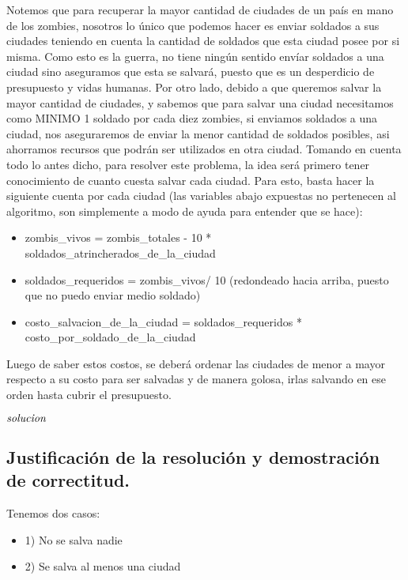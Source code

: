Notemos que para recuperar la mayor cantidad de ciudades de un país en mano de los zombies, nosotros lo único que podemos hacer es enviar soldados a sus ciudades teniendo en cuenta la cantidad de soldados que esta ciudad posee por si misma. Como esto es la guerra, no tiene ningún sentido envíar soldados a una ciudad sino aseguramos que esta se salvará, puesto que es un desperdicio de presupuesto y vidas humanas. Por otro lado, debido a que queremos salvar la mayor cantidad de ciudades, y sabemos que para salvar una ciudad necesitamos como MINIMO 1 soldado por cada diez zombies, si enviamos soldados a una ciudad, nos aseguraremos de enviar la menor cantidad de soldados posibles, asi ahorramos recursos que podrán ser utilizados en otra ciudad. Tomando en cuenta todo lo antes dicho, para resolver este problema, la idea será primero tener conocimiento de cuanto cuesta salvar cada ciudad. Para esto, basta hacer la siguiente cuenta por cada ciudad (las variables abajo expuestas no pertenecen al algoritmo, son simplemente a modo de ayuda para entender que se hace):
\begin{itemize}
   \item  zombis_vivos = zombis_totales - 10 * soldados_atrincherados_de_la_ciudad
   \item  soldados_requeridos = zombis_vivos/ 10 (redondeado hacia arriba, puesto que no puedo enviar medio soldado)
   \item costo_salvacion_de_la_ciudad = soldados_requeridos * costo_por_soldado_de_la_ciudad  
\end{itemize}

Luego de saber estos costos, se deberá ordenar las ciudades de menor a mayor respecto a su costo para ser salvadas y de manera golosa, irlas salvando en ese orden hasta cubrir el presupuesto.

\begin{codebox}
\li \Return $\id{solucion}$
\end{codebox}



\newpage
\subsection{Justificación de la resolución y demostración de correctitud.}

\vspace*{0.3cm}

Tenemos dos casos:
\begin{itemize}
	\item 1) No se salva nadie
	\item 2) Se salva al menos una ciudad
\end{itemize}

